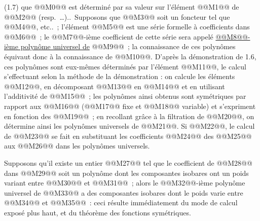 
(1.7) que @@M0@@ est
déterminé par sa valeur sur l'élément @@M1@@ de @@M2@@ (resp.\ \ldots)..\ Supposons que @@M3@@ soit un foncteur tel que @@M4@@, etc..~; l'élément @@M5@@ est une série formelle à coefficients dans @@M6@@~; le @@M7@@-ième coefficient de cette série sera appelé \uline{@@M8@@-ième polynôme universel de} @@M9@@~; la connaissance de ces polynômes équivaut donc à la connaissance de @@M10@@. D'après la démonstration de 1.6, ces polynômes sont eux-mêmes déterminés par l'élément @@M11@@, le calcul s'effectuant selon la méthode de la démonstration : on calcule les éléments @@M12@@, en décomposant @@M13@@ en @@M14@@ et en utilisant l'additivité de @@M15@@~; les polynômes ainsi obtenus sont symétriques par rapport aux @@M16@@ (@@M17@@ fixe et @@M18@@ variable) et s'expriment en fonction des @@M19@@~; en recollant grâce à la filtration de @@M20@@, on détermine ainsi les polynômes universels de @@M21@@. Si @@M22@@, le calcul de @@M23@@ se fait en substituant les coefficients @@M24@@ des @@M25@@ aux @@M26@@ dans les polynômes universels.

Supposons qu'il existe un entier @@M27@@ tel que le coefficient de @@M28@@ dans @@M29@@ soit un polynôme dont les composantes isobares ont un poids variant entre @@M30@@ et @@M31@@~; alors le @@M32@@-ième polynôme universel de @@M33@@ a des composantes isobares dont le poids varie entre @@M34@@ et @@M35@@~: ceci résulte immédiatement du mode de calcul exposé plus haut, et du théorème des fonctions symétriques.

